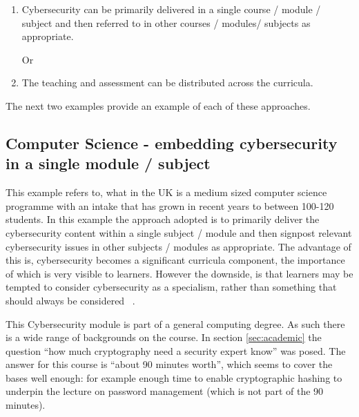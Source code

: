 \documentclass[conference]{IEEEtran}
\begin{document}
\begin{enumerate}
	\item Cybersecurity can be primarily delivered in a single course / module / subject and then referred to in other courses / modules/ subjects as appropriate.
	
	Or
	
	\item  The teaching  and assessment can be distributed across the curricula.  
\end{enumerate}
The next two examples provide an example of each of these approaches.
  
\subsection{Computer Science - embedding cybersecurity in a single module / subject }\label{sec:second} %
This example refers to, what in the UK is a medium sized computer science programme with an intake that has grown in recent years to between 100-120 students. In this example the approach adopted is to primarily deliver the cybersecurity content within a single subject / module and then signpost relevant  cybersecurity issues in other subjects / modules as appropriate. The advantage of this is, cybersecurity becomes a significant curricula component, the importance of which is very visible to learners. However the downside, is that learners may be tempted to consider cybersecurity as a specialism, rather than something that should always be considered~ \cite{Naiakshinaetal2017a}.

This Cybersecurity module is part of a general computing degree. As such there is a wide range of backgrounds on the course. In section \ref{sec:academic} the question ``how much cryptography need a security expert know'' was posed. The answer for this course is ``about 90 minutes worth'', which seems to cover the bases well enough: for example enough time to enable  cryptographic hashing to underpin the lecture on password management (which is not part of the 90 minutes).
\end{document}
